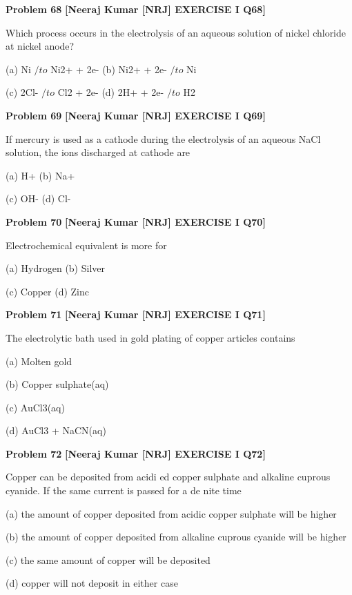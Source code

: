 \begin{problembox}
\textbf{Problem 68} \hfill \textbf{[Neeraj Kumar [NRJ] EXERCISE I Q68]}
\label{q:ext-nrj_all_questions-68}

Which process occurs in the electrolysis of an 
aqueous solution of nickel chloride at nickel anode?
 
 (a) Ni $/to$ Ni2+ + 2e- 
(b) Ni2+ + 2e- $/to$ Ni
 
 (c) 2Cl- $/to$ Cl2 + 2e- 
(d) 2H+ + 2e- $/to$ H2
\end{problembox}

\begin{problembox}
\textbf{Problem 69} \hfill \textbf{[Neeraj Kumar [NRJ] EXERCISE I Q69]}
\label{q:ext-nrj_all_questions-69}

If mercury is used as a cathode during the 
electrolysis of an aqueous NaCl solution, the ions 
discharged at cathode are
 
 (a) H+ 
(b) Na+
 
 (c) OH- 
(d) Cl-
\end{problembox}

\begin{problembox}
\textbf{Problem 70} \hfill \textbf{[Neeraj Kumar [NRJ] EXERCISE I Q70]}
\label{q:ext-nrj_all_questions-70}

Electrochemical equivalent is more for
 
 (a) Hydrogen 
(b) Silver
 
 (c) Copper 
(d) Zinc
\end{problembox}

\begin{problembox}
\textbf{Problem 71} \hfill \textbf{[Neeraj Kumar [NRJ] EXERCISE I Q71]}
\label{q:ext-nrj_all_questions-71}

The electrolytic bath used in gold plating of copper 
articles contains
 
 (a) Molten gold
 
 (b) Copper sulphate(aq)
 
 (c) AuCl3(aq)
 
 (d) AuCl3 + NaCN(aq)
\end{problembox}

\begin{problembox}
\textbf{Problem 72} \hfill \textbf{[Neeraj Kumar [NRJ] EXERCISE I Q72]}
\label{q:ext-nrj_all_questions-72}

Copper can be deposited from acidi  ed copper 
sulphate and alkaline cuprous cyanide. If the same 
current is passed for a de  nite time
 
 (a)  the amount of copper deposited from acidic 
copper sulphate will be higher
 
 (b)  the amount of copper deposited from alkaline 
cuprous cyanide will be higher
 
 (c)  the same amount of copper will be deposited
 
 (d) copper will not deposit in either case
\end{problembox}

